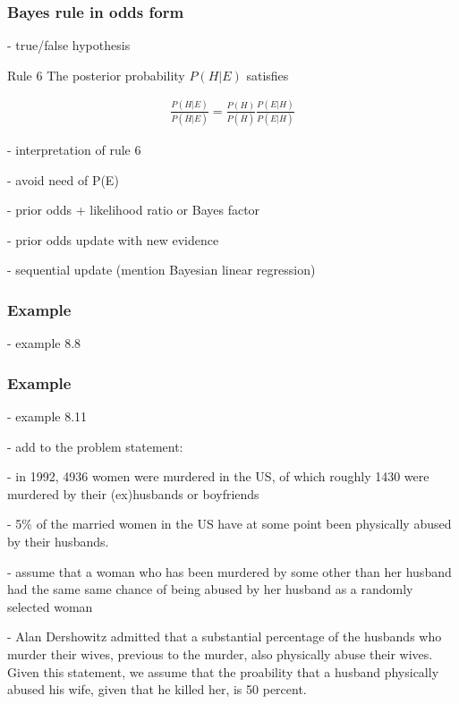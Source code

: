 \begin{frame}
    \frametitle{Bayes rule in odds form}

- true/false hypothesis

    \begin{description}

        \item{Rule 6} The posterior probability $P(H|E)$ satisfies

            \begin{align*}
                \frac{P(H|E)}{P(\bar{H}|E)} = \frac{P(H)}{P(\bar{H})}\frac{P(E|H)}{P(E|\bar{H})}
            \end{align*}

    \end{description}

- interpretation of rule 6

    - avoid need of P(E)

    - prior odds + likelihood ratio or Bayes factor

    - prior odds update with new evidence

    - sequential update (mention Bayesian linear regression)

\end{frame}

\begin{frame}
    \frametitle{Example}

- example 8.8

\end{frame}

\begin{frame}
    \frametitle{Example}

- example 8.11

    - add to the problem statement:

        - in 1992, 4936 women were murdered in the US, of which roughly 1430 were murdered by their (ex)husbands or boyfriends

        - 5\% of the married women in the US have at some point been physically abused by their husbands.

        - assume that a woman who has been murdered by some other than her husband had the same same chance of being abused by her husband as a randomly selected woman

        - Alan Dershowitz admitted that a substantial percentage of the husbands who murder their wives, previous to the murder, also physically abuse their wives. Given this statement, we assume that the proability that a husband physically abused his wife, given that he killed her, is 50 percent.

\end{frame}


